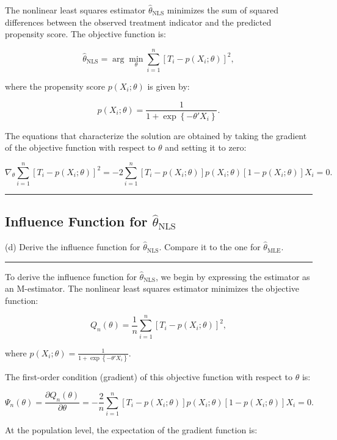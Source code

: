 \documentclass{article}
\newenvironment{colorparagraph}[1]{\par\color{#1}}{\par}
\begin{document}
The nonlinear least squares estimator \( \hat{\theta}_{\text{NLS}} \) minimizes the sum of squared differences between the observed treatment indicator and the predicted propensity score. The objective function is:

\[
\hat{\theta}_{\text{NLS}} = \arg\min_{\theta} \sum_{i=1}^n \left[ T_i - p(X_i; \theta) \right]^2,
\]

where the propensity score \( p(X_i; \theta) \) is given by:

\[
p(X_i; \theta) = \frac{1}{1 + \exp\left\{ - \theta' X_i \right\}}.
\]

The equations that characterize the solution are obtained by taking the gradient of the objective function with respect to \( \theta \) and setting it to zero:

\[
\nabla_{\theta} \sum_{i=1}^n \left[ T_i - p(X_i; \theta) \right]^2 = -2 \sum_{i=1}^n \left[ T_i - p(X_i; \theta) \right] p(X_i; \theta) [1 - p(X_i; \theta)] X_i = 0.
\]

\begin{colorparagraph}{questioncolor}
\label{q1d}
\rule{\textwidth}{0.5pt}
\subsection{Influence Function for \( \hat{\theta}_{\text{NLS}} \)}
(d) Derive the influence function for \( \hat{\theta}_{\text{NLS}} \).
Compare it to the one for \( \hat{\theta}_{\text{MLE}} \).

\rule{\textwidth}{0.5pt}
\end{colorparagraph}

To derive the influence function for \( \hat{\theta}_{\text{NLS}} \), we begin by expressing the estimator as an M-estimator. The nonlinear least squares estimator minimizes the objective function:

\[
Q_n(\theta) = \frac{1}{n} \sum_{i=1}^n \left[ T_i - p(X_i; \theta) \right]^2,
\]

where \( p(X_i; \theta) = \frac{1}{1 + \exp\left\{ - \theta' X_i \right\}} \).

The first-order condition (gradient) of this objective function with respect to \( \theta \) is:

\[
\Psi_n(\theta) = \frac{\partial Q_n(\theta)}{\partial \theta} = -\frac{2}{n} \sum_{i=1}^n \left[ T_i - p(X_i; \theta) \right] p(X_i; \theta) [1 - p(X_i; \theta)] X_i = 0.
\]

At the population level, the expectation of the gradient function is:
\end{document}
